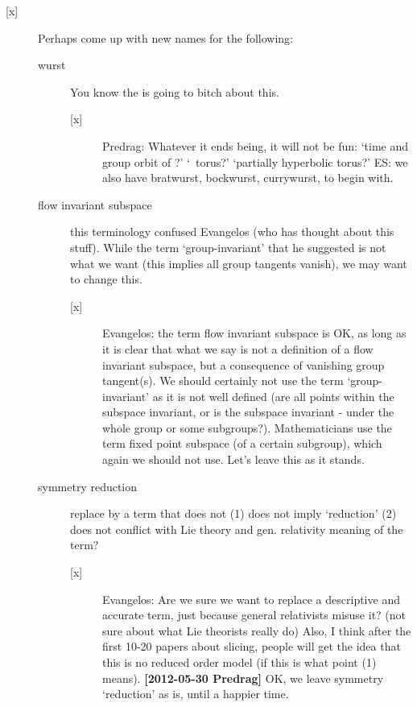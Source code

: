 \begin{description}
\begin{description}
\item[{[x]}] Perhaps come up with new names for the following:
	\begin{description}
	\item[wurst] You know the
                  is going to bitch about this.
		\begin{description}
			\item[{[x]}] Predrag: Whatever it ends being, it will not be
                    fun: `time and group orbit of \ssp?' `\rpo\ torus?'
                    `partially hyperbolic torus?'
					{ES: we also have bratwurst, bockwurst, currywurst, to
					begin with.}
		 \end{description}
	\item[flow invariant subspace] this terminology confused Evangelos
        (who has thought about this stuff). While the term `group-invariant' that
        he suggested is not what we want (this implies all group tangents
        vanish), we may want to change this.
	  \begin{description}
	   \item[{[x]}] Evangelos: the term flow invariant subspace is OK,
	    as long as it is clear that what we say is not a definition
	    of a flow invariant subspace, but a consequence of vanishing group
	    tangent(s). We should certainly not use the term `group-invariant'
	    as it is not well defined (are all points within the subspace
	    invariant, or is the subspace invariant - under the whole group or
	    some subgroups?). Mathematicians use the term
	    fixed point subspace (of a certain subgroup), which again we should
	    not use. Let's leave this as it stands.
	   \end{description}
	\item[symmetry reduction] replace by a term that does not (1) does
        not imply `reduction' (2) does not conflict with Lie theory and gen.
        relativity meaning of the term?
	  \begin{description}
	   \item[{[x]}] Evangelos: Are we sure we want to replace
	    a descriptive and accurate term, just because general relativists
	    misuse it? (not sure about what Lie theorists really do)
	    Also, I think after the first 10-20 papers about slicing, people
	    will get the idea that this is no reduced order model (if this
	    is what point (1) means).
        {\bf [2012-05-30 Predrag]} OK, we leave symmetry  `reduction' as is, until a happier time.
	  \end{description}
	\end{description}
	

\end{description}
\end{description}
